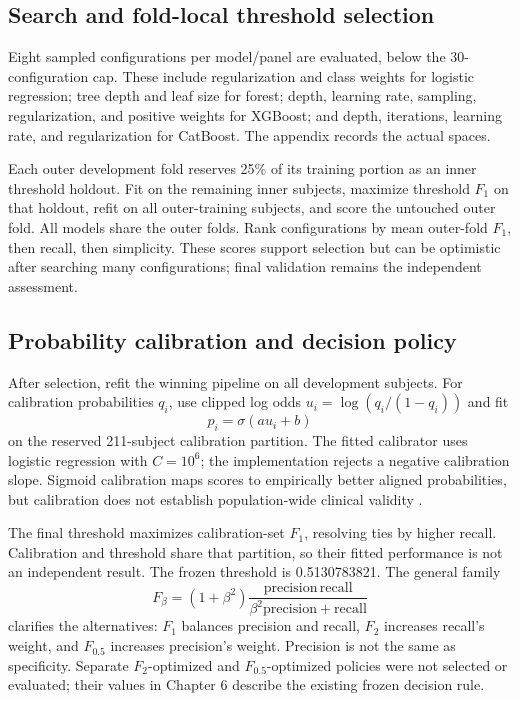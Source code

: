\documentclass[11pt,a4paper]{article}
\begin{document}
\subsection{Search and fold-local threshold selection}
Eight sampled configurations per model/panel are evaluated, below the 30-configuration cap. These include regularization and class weights for logistic regression; tree depth and leaf size for forest; depth, learning rate, sampling, regularization, and positive weights for XGBoost; and depth, iterations, learning rate, and regularization for CatBoost. The appendix records the actual spaces.

Each outer development fold reserves 25\% of its training portion as an inner threshold holdout. Fit on the remaining inner subjects, maximize threshold $F_1$ on that holdout, refit on all outer-training subjects, and score the untouched outer fold. All models share the outer folds. Rank configurations by mean outer-fold $F_1$, then recall, then simplicity. These scores support selection but can be optimistic after searching many configurations; final validation remains the independent assessment.

\clearpage
\subsection{Probability calibration and decision policy}
After selection, refit the winning pipeline on all development subjects. For calibration probabilities $q_i$, use clipped log odds $u_i=\log(q_i/(1-q_i))$ and fit
\begin{equation}p_i=\sigma(a u_i+b)\end{equation}
on the reserved 211-subject calibration partition. The fitted calibrator uses logistic regression with $C=10^6$; the implementation rejects a negative calibration slope. Sigmoid calibration maps scores to empirically better aligned probabilities, but calibration does not establish population-wide clinical validity \cite{calibration}.

The final threshold maximizes calibration-set $F_1$, resolving ties by higher recall. Calibration and threshold share that partition, so their fitted performance is not an independent result. The frozen threshold is 0.5130783821. The general family
\begin{equation}F_\beta=(1+\beta^2)\frac{\mathrm{precision}\,\mathrm{recall}}{\beta^2\mathrm{precision}+\mathrm{recall}}\end{equation}
clarifies the alternatives: $F_1$ balances precision and recall, $F_2$ increases recall's weight, and $F_{0.5}$ increases precision's weight. Precision is not the same as specificity. Separate $F_2$-optimized and $F_{0.5}$-optimized policies were not selected or evaluated; their values in Chapter 6 describe the existing frozen decision rule.
\end{document}
